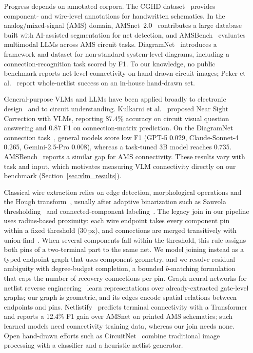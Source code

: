 \documentclass{ieeeaccess}
\begin{document}
Progress depends on annotated corpora. The CGHD dataset~\cite{bayer2021cghd,cghd1152data} provides component- and wire-level annotations for handwritten schematics. In the analog/mixed-signal (AMS) domain, AMSnet~2.0~\cite{amsnet2025} contributes a large database built with AI-assisted segmentation for net detection, and AMSBench~\cite{amsbench2025} evaluates multimodal LLMs across AMS circuit tasks. DiagramNet~\cite{diagramnet2026} introduces a framework and dataset for non-standard system-level diagrams, including a connection-recognition task scored by F1. To our knowledge, no public benchmark reports net-level connectivity on hand-drawn circuit images; Peker et al.~\cite{peker2026} report whole-netlist success on an in-house hand-drawn set.

General-purpose VLMs and LLMs have been applied broadly to electronic design~\cite{llm4eda2024} and to circuit understanding. Kulkarni et al.~\cite{kulkarni2025enhancing} proposed Near Sight Correction with VLMs, reporting 87.4\% accuracy on circuit visual question answering and 0.87 F1 on connection-matrix prediction. On the DiagramNet connection task~\cite{diagramnet2026}, general models score low F1 (GPT-5 0.029, Claude-Sonnet-4 0.265, Gemini-2.5-Pro 0.008), whereas a task-tuned 3B model reaches 0.735. AMSBench~\cite{amsbench2025} reports a similar gap for AMS connectivity. These results vary with task and input, which motivates measuring VLM connectivity directly on our benchmark (Section~\ref{sec:vlm_results}).

Classical wire extraction relies on edge detection, morphological operations and the Hough transform~\cite{duda1972hough}, usually after adaptive binarization such as Sauvola thresholding~\cite{sauvola2000} and connected-component labeling~\cite{he2017ccl}. The legacy join in our pipeline uses radius-based proximity: each wire endpoint takes every component pin within a fixed threshold (30\,px), and connections are merged transitively with union-find~\cite{tarjan1975union}. When several components fall within the threshold, this rule assigns both pins of a two-terminal part to the same net. We model joining instead as a typed endpoint graph that uses component geometry, and we resolve residual ambiguity with degree-budget completion, a bounded $b$-matching formulation~\cite{kuhn1955,schrijver2003combinatorial} that caps the number of recovery connections per pin. Graph neural networks for netlist reverse engineering~\cite{alrahis2021gnn} learn representations over already-extracted gate-level graphs; our graph is geometric, and its edges encode spatial relations between endpoints and pins. Netlistify~\cite{netlistify2025} predicts terminal connectivity with a Transformer and reports a 12.4\% F1 gain over AMSnet on printed AMS schematics; such learned models need connectivity training data, whereas our join needs none. Open hand-drawn efforts such as CircuitNet~\cite{circuitnet} combine traditional image processing with a classifier and a heuristic netlist generator.
\end{document}
